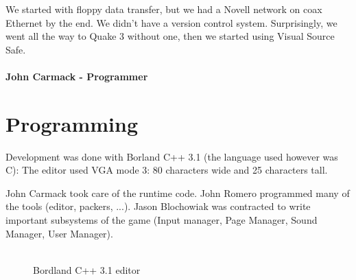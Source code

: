 \documentclass[book.tex]{subfiles}
\begin{document}
 \begin{fancyquotes}
We started with floppy data transfer, but we had a Novell network on coax Ethernet by the end. We didn't have a version control system.  Surprisingly, we went all the way to Quake 3 without one, then we started using Visual Source Safe.\\
 \\
\textbf{John Carmack - Programmer}
\end{fancyquotes}


























\section{Programming}



Development was done with Borland C++ 3.1 (the language used however was C): The editor used VGA mode 3: 80 characters wide and 25 characters tall.

John Carmack took care of the runtime code. John Romero programmed many of the tools (editor, packers, ...). Jason Blochowiak was contracted to write important subsystems of the game (Input manager, Page Manager, Sound Manager, User Manager).\\
\\
\begin{figure}[H]
\centering
\caption{Bordland C++ 3.1 editor}
\end{figure}
\end{document}
